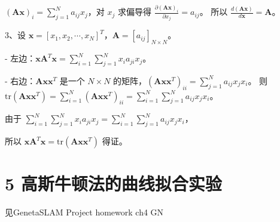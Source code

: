 \documentclass[12pt, a4paper, oneside]{ctexart}
\begin{document}
	$(\mathbf{Ax})_i=\sum_{j = 1}^{N}a_{ij}x_j$，对 $x_j$ 求偏导得 $\frac{\partial (\mathbf{Ax})_i}{\partial x_j}=a_{ij}$。
	所以 $\frac{d(\mathbf{Ax})}{d\mathbf{x}}=\mathbf{A}$。
	
	
	3、设 $\mathbf{x} = [x_1, x_2, \cdots, x_N]^T$，$\mathbf{A} = [a_{ij}]_{N\times N}$。
	
	- 左边：$\mathbf{x}\mathbf{A}^T\mathbf{x}=\sum_{i = 1}^{N}\sum_{j = 1}^{N}x_ia_{ji}x_j$。
	
	- 右边：$\mathbf{A}\mathbf{x}\mathbf{x}^T$ 是一个 $N\times N$ 的矩阵，$(\mathbf{A}\mathbf{x}\mathbf{x}^T)_{ii}=\sum_{j = 1}^{N}a_{ij}x_jx_i$。
	则 $\text{tr}(\mathbf{A}\mathbf{x}\mathbf{x}^T)=\sum_{i = 1}^{N}(\mathbf{A}\mathbf{x}\mathbf{x}^T)_{ii}=\sum_{i = 1}^{N}\sum_{j = 1}^{N}a_{ij}x_jx_i$。
	
	由于 $\sum_{i = 1}^{N}\sum_{j = 1}^{N}x_ia_{ji}x_j=\sum_{i = 1}^{N}\sum_{j = 1}^{N}a_{ij}x_jx_i$，
	
	所以 $\mathbf{x}\mathbf{A}^T\mathbf{x}=\text{tr}(\mathbf{A}\mathbf{x}\mathbf{x}^T)$ 得证。
	
	\section{5 高斯牛顿法的曲线拟合实验}
	
	见GenetaSLAM Project homework ch4 GN
	
\end{document}
